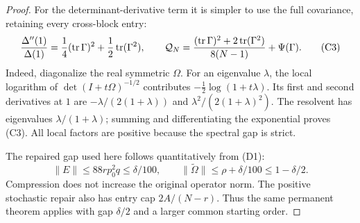 \begin{proof}
For the determinant-derivative term it is simpler to use the full
covariance, retaining every cross-block entry:
\[
 \frac{\Delta''(1)}{\Delta(1)}
   =\frac14(\operatorname{tr}\Gamma)^2
                         +\frac12\operatorname{tr}(\Gamma^2),\qquad
 {\cal Q}_N
   =\frac{(\operatorname{tr}\Gamma)^2+
                    2\operatorname{tr}(\Gamma^2)}{8(N-1)}
                         +\Psi(\Gamma).                     \tag{C3}
\]
Indeed, diagonalize the real symmetric \(\Omega\).
For an eigenvalue \(\lambda\), the local logarithm of
\(\det(I+t\Omega)^{-1/2}\) contributes
\(-\tfrac12\log(1+t\lambda)\).
Its first and second derivatives at \(1\) are
\(-\lambda/(2(1+\lambda))\) and
\(\lambda^2/(2(1+\lambda)^2)\).
The resolvent has eigenvalues \(\lambda/(1+\lambda)\);
summing and differentiating the exponential proves (C3).
All local factors are positive because the spectral gap is strict.

The repaired gap used here follows quantitatively from (D1):
\[
 \|E\|\leq88rp_0^2q\leq\delta/100,\qquad
 \|\widetilde\Omega\|\leq\rho+\delta/100
                                      \leq1-\delta/2.
\]
Compression does not increase the original operator norm.
The positive stochastic repair also has entry cap \(2A/(N-r)\).
Thus the same permanent theorem applies with gap \(\delta/2\)
and a larger common starting order.


\end{proof}
